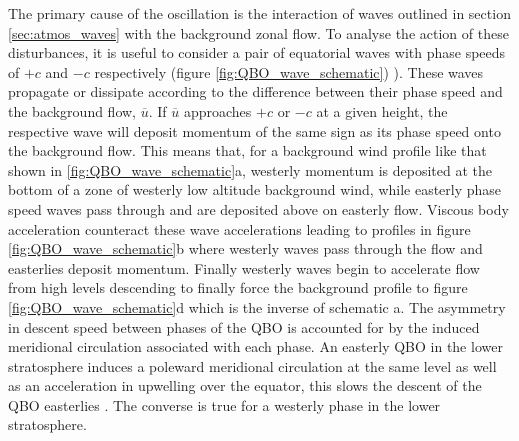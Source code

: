 The primary cause of the oscillation is the interaction of waves outlined in section \ref{sec:atmos_waves} with the background zonal flow. To analyse the action of these disturbances, it is useful to consider a pair of equatorial waves with phase speeds of $+c $ and $-c$ respectively (figure \ref{fig:QBO_wave_schematic}) \citep{Plumb1984}). These waves propagate or dissipate according to the difference between their phase speed and the background flow, $\overbar{u}$. If $\overbar{u}$ approaches $+c$ or $-c$ at a given height, the respective wave will deposit momentum of the same sign as its phase speed onto the background flow. This means that, for a background wind profile like that shown in \ref{fig:QBO_wave_schematic}a, westerly momentum is deposited at the bottom of a zone of westerly low altitude background wind, while easterly phase speed waves pass through and are deposited above on easterly flow. Viscous body acceleration counteract these wave accelerations leading to profiles in figure \ref{fig:QBO_wave_schematic}b where westerly waves pass through the flow and easterlies deposit momentum. Finally westerly waves begin to accelerate flow from high levels descending to finally force the background profile to figure \ref{fig:QBO_wave_schematic}d which is the inverse of schematic a. The asymmetry in descent speed between phases of the QBO is accounted for by the induced meridional circulation associated with each phase. An easterly QBO in the lower stratosphere induces a poleward meridional circulation at the same level \citep{plumb82,Baldwin2001} as well as an acceleration in upwelling over the equator, this slows the descent of the QBO easterlies \citep{Reed1964}. The converse is true for a westerly phase in the lower stratosphere.

